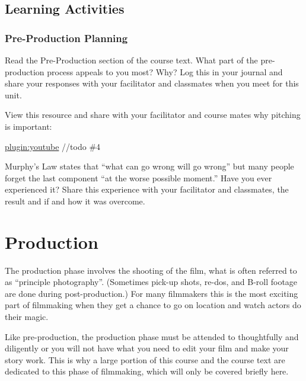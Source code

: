 \documentclass[
]{book}
\begin{document}
\hypertarget{learning-activities-6}{%
\subsection*{Learning Activities}\label{learning-activities-6}}

\begin{reflect}
\hypertarget{pre-production-planning}{%
\subsubsection*{Pre-Production Planning}\label{pre-production-planning}}

Read the Pre-Production section of the course text. What part of the pre-production process appeals to you most? Why? Log this in your journal and share your responses with your facilitator and classmates when you meet for this unit.

View this resource and share with your facilitator and course mates why pitching is important:

\href{https://www.youtube.com/watch?v=JE53JL60ihc}{plugin:youtube}
//todo \#4

Murphy's Law states that ``what can go wrong will go wrong'' but many people forget the last component ``at the worse possible moment.'' Have you ever experienced it? Share this experience with your facilitator and classmates, the result and if and how it was overcome.
\end{reflect}

\hypertarget{production}{%
\section{Production}\label{production}}

The production phase involves the shooting of the film, what is often referred to as ``principle photography''. (Sometimes pick-up shots, re-dos, and B-roll footage are done during post-production.) For many filmmakers this is the most exciting part of filmmaking when they get a chance to go on location and watch actors do their magic.

Like pre-production, the production phase must be attended to thoughtfully and diligently or you will not have what you need to edit your film and make your story work. This is why a large portion of this course and the course text are dedicated to this phase of filmmaking, which will only be covered briefly here.
\end{document}
